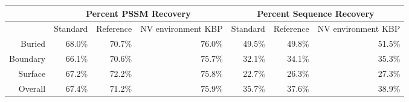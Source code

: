 \begin{tabular}{|r|r|r|r|r|r|r|}
\hline
 & \multicolumn{3}{c}{Percent PSSM Recovery} & \multicolumn{3}{|c|}{Percent Sequence Recovery}\\
\hline
  & Standard & Reference & NV environment KBP & Standard & Reference & NV environment KBP \\
\hline
Buried & 68.0\% & 70.7\% & 76.0\% & 49.5\% & 49.8\% & 51.5\% \\
\hline
Boundary & 66.1\% & 70.6\% & 75.7\% & 32.1\% & 34.1\% & 35.3\% \\
\hline
Surface & 67.2\% & 72.2\% & 75.8\% & 22.7\% & 26.3\% & 27.3\% \\
\hline
Overall & 67.4\% & 71.2\% & 75.9\% & 35.7\% & 37.6\% & 38.9\% \\
\hline
\end{tabular}